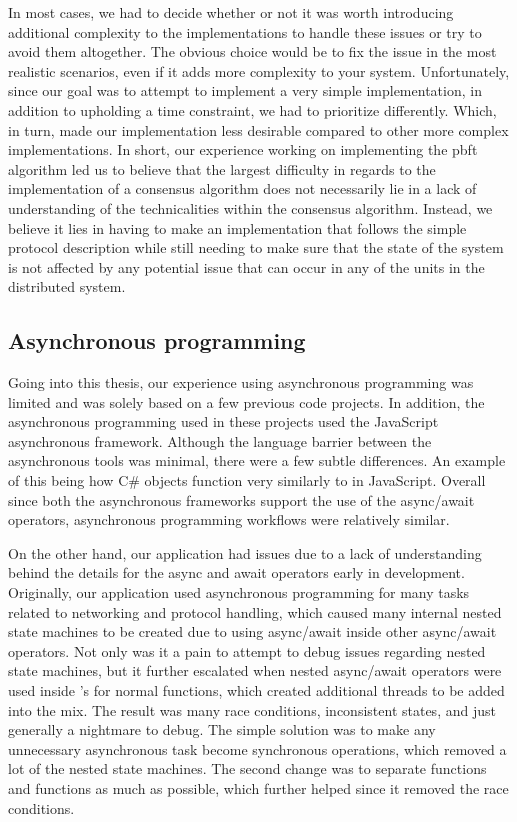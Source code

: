 In most cases, we had to decide whether or not it was worth introducing additional complexity to the implementations to handle these issues or try to avoid them altogether. The obvious choice would be to fix the issue in the most realistic scenarios, even if it adds more complexity to your system. Unfortunately, since our goal was to attempt to implement a very simple implementation, in addition to upholding a time constraint, we had to prioritize differently. Which, in turn, made our implementation less desirable compared to other more complex implementations. In short, our experience working on implementing the \ac{pbft} algorithm led us to believe that the largest difficulty in regards to the implementation of a consensus algorithm does not necessarily lie in a lack of understanding of the technicalities within the consensus algorithm. Instead, we believe it lies in having to make an implementation that follows the simple protocol description while still needing to make sure that the state of the system is not affected by any potential issue that can occur in any of the units in the distributed system. 

\subsection{Asynchronous programming}
Going into this thesis, our experience using asynchronous programming was limited and was solely based on a few previous code projects. In addition, the asynchronous programming used in these projects used the JavaScript asynchronous framework. Although the language barrier between the asynchronous tools was minimal, there were a few subtle differences. An example of this being how C\#  objects function very similarly to  in JavaScript. Overall since both the asynchronous frameworks support the use of the async/await operators, asynchronous programming workflows were relatively similar.

On the other hand, our application had issues due to a lack of understanding behind the details for the async and await operators early in development. Originally, our application used asynchronous programming for many tasks related to networking and protocol handling, which caused many internal nested state machines to be created due to using async/await inside other async/await operators. Not only was it a pain to attempt to debug issues regarding nested state machines, but it further escalated when nested async/await operators were used inside  ’s for normal  functions, which created additional threads to be added into the mix. The result was many race conditions, inconsistent states, and just generally a nightmare to debug. The simple solution was to make any unnecessary asynchronous task become synchronous operations, which removed a lot of the nested state machines. The second change was to separate  functions and  functions as much as possible, which further helped since it removed the race conditions.

